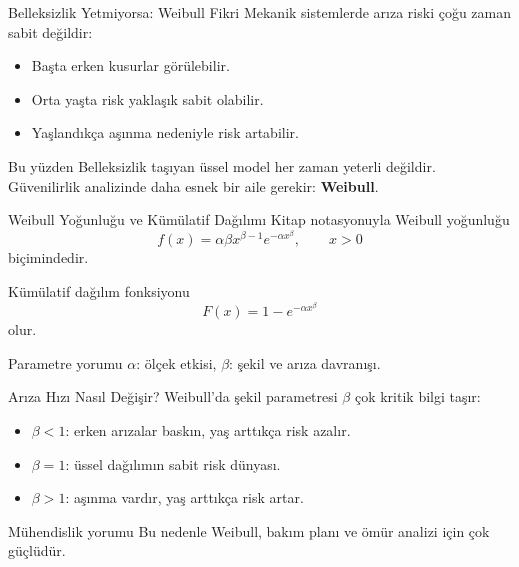 \documentclass[light]{lutbeamer}
\begin{document}
\begin{frame}{Belleksizlik Yetmiyorsa: Weibull Fikri}
    \small
    Mekanik sistemlerde arıza riski çoğu zaman sabit değildir:

    \begin{itemize}
        \item Başta erken kusurlar görülebilir.
        \item Orta yaşta risk yaklaşık sabit olabilir.
        \item Yaşlandıkça aşınma nedeniyle risk artabilir.
    \end{itemize}

    \begin{alertblock}{Bu yüzden}
        Belleksizlik taşıyan üssel model her zaman yeterli değildir.
        Güvenilirlik analizinde daha esnek bir aile gerekir: \textbf{Weibull}.
    \end{alertblock}
\end{frame}

\begin{frame}{Weibull Yoğunluğu ve Kümülatif Dağılımı}
    \small
    Kitap notasyonuyla Weibull yoğunluğu
    \[
    f(x)=\alpha\beta x^{\beta-1}e^{-\alpha x^\beta}, \qquad x>0
    \]
    biçimindedir.

    Kümülatif dağılım fonksiyonu
    \[
    F(x)=1-e^{-\alpha x^\beta}
    \]
    olur.

    \begin{block}{Parametre yorumu}
        \(\alpha\): ölçek etkisi, \qquad \(\beta\): şekil ve arıza davranışı.
    \end{block}
\end{frame}

\begin{frame}{Arıza Hızı Nasıl Değişir?}
    \small
    Weibull'da şekil parametresi \(\beta\) çok kritik bilgi taşır:

    \begin{itemize}
        \item \(\beta<1\): erken arızalar baskın, yaş arttıkça risk azalır.
        \item \(\beta=1\): üssel dağılımın sabit risk dünyası.
        \item \(\beta>1\): aşınma vardır, yaş arttıkça risk artar.
    \end{itemize}

    \begin{alertblock}{Mühendislik yorumu}
        Bu nedenle Weibull, bakım planı ve ömür analizi için çok güçlüdür.
    \end{alertblock}
\end{frame}
\end{document}
